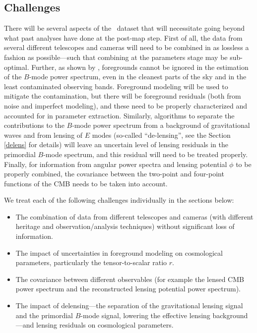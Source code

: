 \subsection{Challenges}
\label{se:challenges}
There will be several 
aspects of the \cmbexp\ dataset that will necessitate going beyond what past analyses
have done at the post-map step. First of all, the data from several different telescopes and cameras will need
to be combined in as lossless a fashion as possible---such that combining at the parameters stage
may be sub-optimal.
Further, as shown by \cite{Ade:2015tva}, foregrounds cannot be ignored in the 
estimation of the $B$-mode power spectrum, even in the cleanest parts of the sky and in the 
least contaminated observing bands. Foreground modeling will be used to mitigate the contamination,
but there will be foreground residuals (both from noise and imperfect modeling), and these need
to be properly characterized and accounted for in parameter extraction. 
Similarly, algorithms to separate the contributions to the $B$-mode power spectrum from a background of gravitational
waves and from lensing of $E$ modes (so-called ``de-lensing'', see the Section \ref{delens} for 
details) will leave an uncertain level of lensing residuals in the primordial $B$-mode spectrum, and
this residual will need to be treated properly. Finally, for information from angular power spectra
and lensing potential $\phi$ to be properly combined, the covariance between the two-point and
four-point functions of the CMB needs to be taken into account.

We treat each of the following challenges individually in the sections below:
\begin{itemize}
\item{The combination of data from different telescopes and cameras (with different heritage 
and observation/analysis techniques) without significant loss of information.}
\item{The impact of uncertainties in foreground modeling on cosmological parameters, particularly the tensor-to-scalar ratio $r$.}
\item{The covariance between different observables (for example the lensed CMB power spectrum and the reconstructed lensing potential power spectrum).}
\item{The impact of delensing---the separation of the gravitational lensing signal and the primordial $B$-mode signal, lowering the effective lensing background---and lensing residuals on cosmological parameters.} 
\end{itemize}



